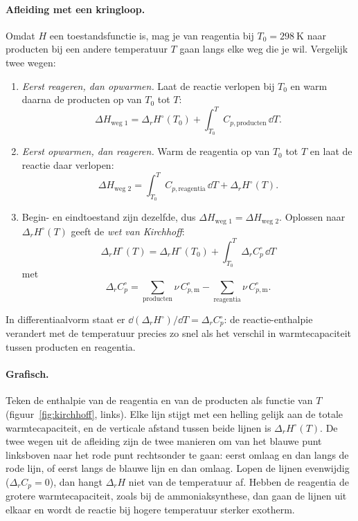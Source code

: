 \paragraph{Afleiding met een kringloop.} Omdat $H$ een toestandsfunctie is, mag je van reagentia bij $T_0 = \SI{298}{\kelvin}$ naar producten bij een andere temperatuur $T$ gaan langs elke weg die je wil. Vergelijk twee wegen:
\begin{enumerate}
\item \emph{Eerst reageren, dan opwarmen.} Laat de reactie verlopen bij $T_0$ en warm daarna de producten op van $T_0$ tot $T$:
\[
\Delta H_\text{weg 1} = \Delta_r H^\circ(T_0) + \int_{T_0}^{T} C_{p,\text{producten}}\,\dd T .
\]
\item \emph{Eerst opwarmen, dan reageren.} Warm de reagentia op van $T_0$ tot $T$ en laat de reactie daar verlopen:
\[
\Delta H_\text{weg 2} = \int_{T_0}^{T} C_{p,\text{reagentia}}\,\dd T + \Delta_r H^\circ(T) .
\]
\item Begin- en eindtoestand zijn dezelfde, dus $\Delta H_\text{weg 1} = \Delta H_\text{weg 2}$. Oplossen naar $\Delta_r H^\circ(T)$ geeft de \emph{wet van Kirchhoff}:
\begin{equation}
\boxed{\;\Delta_r H^\circ(T) = \Delta_r H^\circ(T_0) + \int_{T_0}^{T} \Delta_r C_p^\circ\,\dd T\;}
\label{eq:kirchhoff}
\end{equation}
met
\[
\Delta_r C_p^\circ = \sum_\text{producten} \nu\, C_{p,\mathrm{m}}^\circ - \sum_\text{reagentia} \nu\, C_{p,\mathrm{m}}^\circ .
\]
\end{enumerate}
In differentiaalvorm staat er $\dd(\Delta_r H^\circ)/\dd T = \Delta_r C_p^\circ$: de reactie-enthalpie verandert met de temperatuur precies zo snel als het verschil in warmtecapaciteit tussen producten en reagentia.

\paragraph{Grafisch.} Teken de enthalpie van de reagentia en van de producten als functie van $T$ (figuur~\ref{fig:kirchhoff}, links). Elke lijn stijgt met een helling gelijk aan de totale warmtecapaciteit, en de verticale afstand tussen beide lijnen is $\Delta_r H^\circ(T)$. De twee wegen uit de afleiding zijn de twee manieren om van het blauwe punt linksboven naar het rode punt rechtsonder te gaan: eerst omlaag en dan langs de rode lijn, of eerst langs de blauwe lijn en dan omlaag. Lopen de lijnen evenwijdig ($\Delta_r C_p = 0$), dan hangt $\Delta_r H$ niet van de temperatuur af. Hebben de reagentia de grotere warmtecapaciteit, zoals bij de ammoniaksynthese, dan gaan de lijnen uit elkaar en wordt de reactie bij hogere temperatuur sterker exotherm.


